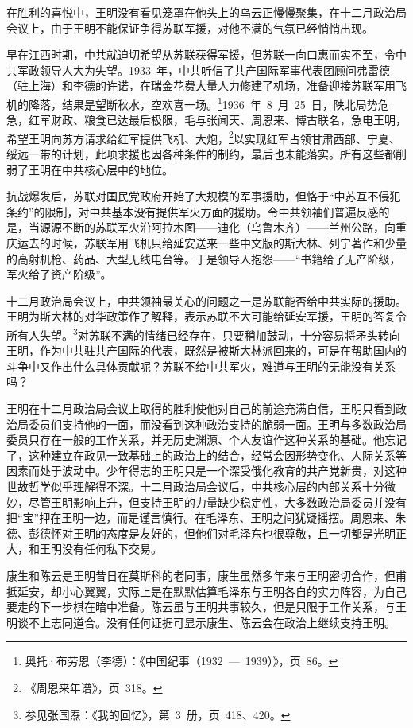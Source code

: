 在胜利的喜悦中，王明没有看见笼罩在他头上的乌云正慢慢聚集，在十二月政治局会议上，由于王明不能保证争得苏联军援，对他不满的气氛已经悄悄出现。

早在江西时期，中共就迫切希望从苏联获得军援，但苏联一向口惠而实不至，令中共军政领导人大为失望。1933~年，中共听信了共产国际军事代表团顾问弗雷德（驻上海）和李德的许诺，在瑞金花费大量人力修建了机场，准备迎接苏联军用飞机的降落，结果是望断秋水，空欢喜一场。\footnote{奥托·布劳恩（李德）：《中国纪事（1932~—~1939）》，页~86。}1936~年~8~月~25~日，陕北局势危急，红军财政、粮食已达最后极限，毛与张闻天、周恩来、博古联名，急电王明，希望王明向苏方请求给红军提供飞机、大炮，\footnote{《周恩来年谱》，页~318。}以实现红军占领甘肃西部、宁夏、绥远一带的计划，此项求援也因各种条件的制约，最后也未能落实。所有这些都削弱了王明在中共核心层中的地位。

抗战爆发后，苏联对国民党政府开始了大规模的军事援助，但恪于“中苏互不侵犯条约”的限制，对中共基本没有提供军火方面的援助。令中共领袖们普遍反感的是，当源源不断的苏联军火沿阿拉木图——迪化（乌鲁木齐）——兰州公路，向重庆运去的时候，苏联军用飞机只给延安送来一些中文版的斯大林、列宁著作和少量的高射机枪、药品、大型无线电台等。于是领导人抱怨——“书籍给了无产阶级，军火给了资产阶级”。

十二月政治局会议上，中共领袖最关心的问题之一是苏联能否给中共实际的援助。王明为斯大林的对华政策作了解释，表示苏联不大可能给延安军援，王明的答复令所有人失望。\footnote{参见张国焘：《我的回忆》，第~3~册，页~418、420。}对苏联不满的情绪已经存在，只要稍加鼓动，十分容易将矛头转向王明，作为中共驻共产国际的代表，既然是被斯大林派回来的，可是在帮助国内的斗争中又作出什么具体贡献呢？苏联不给中共军火，难道与王明的无能没有关系吗？

王明在十二月政治局会议上取得的胜利使他对自己的前途充满自信，王明只看到政治局委员们支持他的一面，而没看到这种政治支持的脆弱一面。王明与多数政治局委员只存在一般的工作关系，并无历史渊源、个人友谊作这种关系的基础。他忘记了，这种建立在政见一致基础上的政治上的结合，经常会因形势变化、人际关系等因素而处于波动中。少年得志的王明只是一个深受俄化教育的共产党新贵，对这种世故哲学似乎理解得不深。十二月政治局会议后，中共核心层的内部关系十分微妙，尽管王明影响上升，但支持王明的力量缺少稳定性，大多数政治局委员并没有把“宝”押在王明一边，而是谨言慎行。在毛泽东、王明之间犹疑摇摆。周恩来、朱德、彭德怀对王明的态度是友好的，但他们对毛泽东也很尊敬，且一切都是光明正大，和王明没有任何私下交易。

康生和陈云是王明昔日在莫斯科的老同事，康生虽然多年来与王明密切合作，但甫抵延安，却小心翼翼，实际上是在默默估算毛泽东与王明各自的实力阵容，为自己要走的下一步棋在暗中准备。陈云虽与王明共事较久，但是只限于工作关系，与王明谈不上志同道合。没有任何证据可显示康生、陈云会在政治上继续支持王明。

